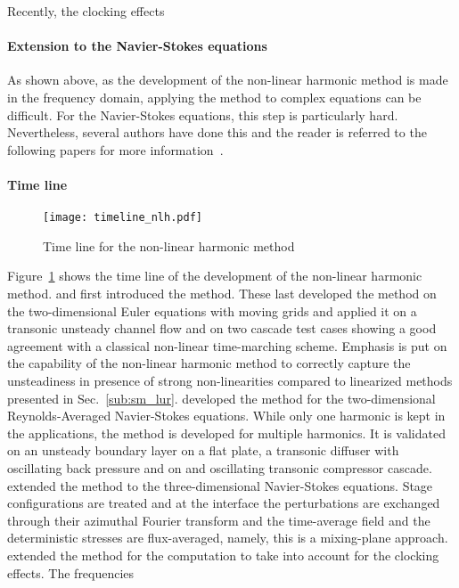 Recently, the clocking effects \citet{Vilmin2013a}

\paragraph{Extension to the Navier-Stokes equations}
As shown above,  as the development of the non-linear harmonic
method is made in the frequency domain, applying the method to
complex equations can be difficult. For the Navier-Stokes equations,
this step is particularly hard. Nevertheless, several authors have
done this and the reader is referred to the following papers
for more information~\cite{He1998,Chen2001, He2002, Vilmin2006}.

\paragraph{Time line}
\begin{figure}[htbp]
  \centering
  \texttt{[image: timeline\_nlh.pdf]}
  \caption{Time line for the non-linear harmonic method}
  \label{fig:timeline_nlh}
\end{figure}
Figure~\ref{fig:timeline_nlh} shows the time line of the
development of the non-linear harmonic method. \citet{He1998}
and \citet{Ning1998} first introduced the method.
These last developed the method on the two-dimensional
Euler equations with moving grids 
and applied it on a transonic unsteady
channel flow and on two cascade test cases
showing a good agreement with a classical non-linear
time-marching scheme. Emphasis is put on the capability
of the non-linear harmonic method to correctly capture
the unsteadiness in presence of strong non-linearities
compared to linearized methods presented in 
Sec.~\ref{sub:sm_lur}.
\citet{He1998} developed the method for the 
two-dimensional Reynolds-Averaged Navier-Stokes equations. 
While only one harmonic is
kept in the applications, the method is developed for multiple
harmonics. It is validated on an unsteady boundary layer
on a flat plate, a transonic diffuser with oscillating back pressure
and on and oscillating transonic compressor cascade.
\citet{Chen2001} extended the method to the three-dimensional
Navier-Stokes equations. Stage configurations are treated and
at the interface the perturbations are exchanged through their
azimuthal Fourier transform and
the time-average field and the deterministic stresses
are flux-averaged, 
namely, this is a mixing-plane approach.
\citet{He2002} extended the method for the computation 
to take into account for the clocking effects. The frequencies
